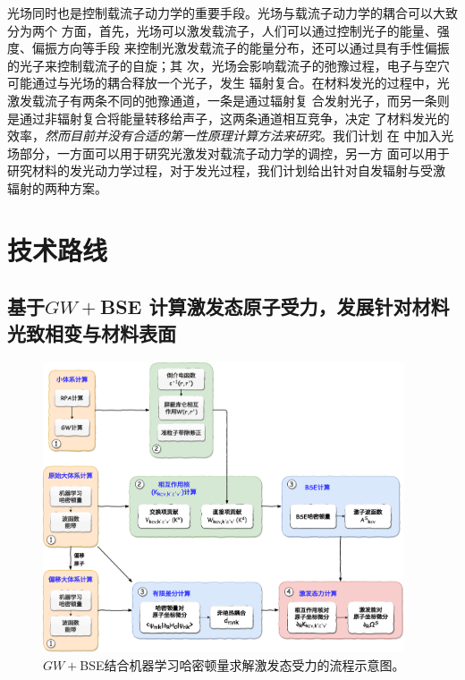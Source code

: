 光场同时也是控制载流子动力学的重要手段。光场与载流子动力学的耦合可以大致分为两个
方面，首先，光场可以激发载流子，人们可以通过控制光子的能量、强度、偏振方向等手段
来控制光激发载流子的能量分布，还可以通过具有手性偏振的光子来控制载流子的自旋；其
次，光场会影响载流子的弛豫过程，电子与空穴可能通过与光场的耦合释放一个光子，发生
辐射复合。在材料发光的过程中，光激发载流子有两条不同的弛豫通道，一条是通过辐射复
合发射光子，而另一条则是通过非辐射复合将能量转移给声子，这两条通道相互竞争，决定
了材料发光的效率，\emph{然而目前并没有合适的第一性原理计算方法来研究}。我们计划
在 \hnamd{} 中加入光场部分，一方面可以用于研究光激发对载流子动力学的调控，另一方
面可以用于研究材料的发光动力学过程，对于发光过程，我们计划给出针对自发辐射与受激
辐射的两种方案。

\section{技术路线}

\subsection{基于$GW+{}$BSE 计算激发态原子受力，发展针对材料光致相变与材料表面}

  \begin{figure}
     \centering
     \captionsetup{width=0.90\textwidth}
     \includegraphics[width=0.95\textwidth]{figs/excited_force_flowchart.pdf}
     \caption{$GW+{}$BSE结合机器学习哈密顿量求解激发态受力的流程示意图。
         \label{fig:excited_force_flowchart}}
  \end{figure}


